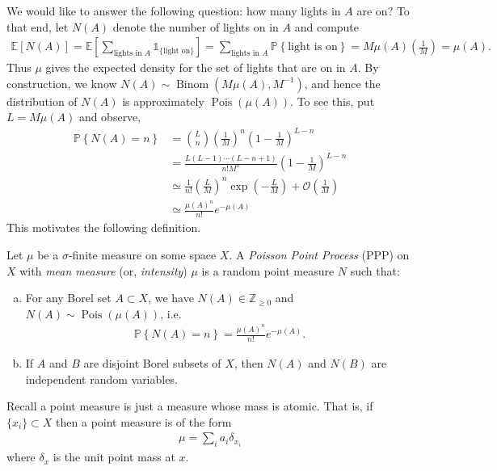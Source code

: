 \documentclass[../../../Master/AppliedStochastics.tex]{subfiles}
\begin{document}
We would like to answer the following question: how many lights in $A$ are on? 
To that end, let $N(A)$ denote the number of lights on in $A$ and compute
\begin{align}
	\mathbb{E}\left[ N(A) \right] = \mathbb{E} \left[ \sum_{\text{lights in }A} 
	\mathds{1}_{\{\text{light on}\}} \right]
	= \sum_{\text{lights in }A} \mathbb{P}\left\{ \text{light is on} \right\}
		= M \mu(A) \left(\frac{1}{M}\right)
		= \mu(A).
\end{align}
Thus $\mu$ gives the expected density for the set of lights that are on in $A$. 
By construction, we know $N(A) \sim 
\operatorname{Binom}\left(M\mu(A),M^{-1}\right)$, and hence the distribution of 
$N(A)$ is approximately $\operatorname{Pois}(\mu(A))$. To see this, put $L = 
M\mu(A)$ and observe,
\begin{align}
	\mathbb{P}\left\{N(A) = n \right\} &= 
	\binom{L}{n}\left(\frac{1}{M}\right)^n\left(1 - \frac{1}{M}\right)^{L-n}\\
	&= \frac{L(L-1)\cdots (L-n+1)}{n! M^n} \left( 1 - \frac{1}{M} 
	\right)^{L-n}\\
	&\simeq \frac{1}{n!}\left( \frac{L}{M} \right)^n \exp\left( -\frac{L}{M} 
	\right) + \mathcal{O}\left( \frac{1}{M} \right)\\
	&\simeq \frac{\mu(A)^n}{n!} e^{-\mu(A)}
\end{align}  
This motivates the following definition.
\begin{definition}
	Let $\mu$ be a $\sigma$-finite measure on some space $X$. A \emph{Poisson 
	Point Process} (PPP) on $X$ with \emph{mean measure} (or, \emph{intensity}) 
	$\mu$ is a random point measure $N$ such that:
	\begin{enumerate}[(a)]
		\item For any Borel set $A\subset X$, we have $N(A) \in 
		\mathbb{Z}_{\geq 0}$ and $N(A) \sim \operatorname{Pois}(\mu(A))$, i.e.
		\begin{align}\label{eq:ppp}
			\mathbb{P}\left\{ N(A) = n \right\} = \frac{\mu(A)^n}{n!} 
			e^{-\mu(A)}.
		\end{align}
		\item If $A$ and $B$ are disjoint Borel subsets of $X$, then $N(A)$ and 
		$N(B)$ are independent random variables.
	\end{enumerate}
\end{definition}
Recall a point measure is just a measure whose mass is atomic. That is, if 
$\{x_i\}\subset X$ then a point measure is of the form
\begin{align}
	\mu = \sum_i a_i \delta_{x_i}
\end{align}
where $\delta_x$ is the unit point mass at $x$.
\end{document}
